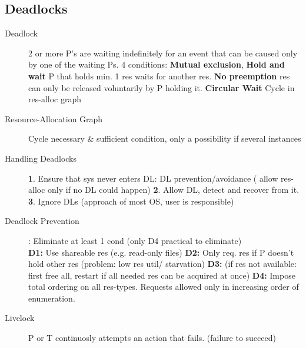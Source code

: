 \subsection*{Deadlocks}
\begin{description}
    \item[Deadlock]2 or more P's are waiting indefinitely for an event that can be caused only by one of the waiting Ps. 4 conditions: \textbf{Mutual exclusion}, \textbf{Hold and wait} P that holds min. 1 res waits for another res. \textbf{No preemption} res can only be released voluntarily by P holding it. \textbf{Circular Wait} Cycle in res-alloc graph
    \item[Resource-Allocation Graph] Cycle necessary \& sufficient condition, only a possibility if several instances%
    \item[Handling Deadlocks]\textbf{1}. Ensure that sys never enters DL: DL prevention/avoidance ( allow res-alloc only if no DL could happen) \textbf{2}. Allow DL, detect and recover from it. \textbf{3}. Ignore DLs (approach of most OS, user is responsible)
    \item[Deadlock Prevention]: Eliminate at least 1 cond (only D4 practical to eliminate) \\
    \textbf{D1:} Use shareable res (e.g. read-only files) \textbf{D2:} Only req. res if P doesn’t hold other res (problem: low res util/ starvation) \textbf{D3:} (if res not available: first free all, restart if all needed res can be acquired at once) \textbf{D4:} Impose total ordering on all res-types. Requests allowed only in increasing order of enumeration.
    \item[Livelock] P or T continuosly attempts an action that fails. (failure to succeed) %
\end{description}

